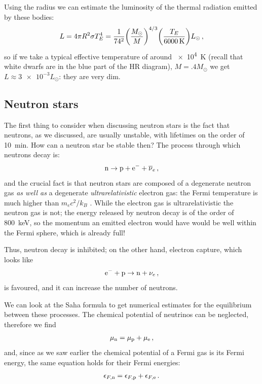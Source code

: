 \documentclass[main.tex]{subfiles}
\begin{document}
Using the radius we can estimate the luminosity of the thermal radiation emitted by these bodies:
%
\begin{align}
L = 4 \pi R^2 \sigma T_E^{4}
= \frac{1}{74^2} \qty(\frac{M_{\odot}}{M})^{4/3}
\qty(\frac{T_E }{\SI{6000}{K}}) L_{\odot}
\,,
\end{align}
%
so if we take a typical effective temperature of around \SI{e4}{K} (recall that white dwarfs are in the blue part of the HR diagram), \(M = \num{.4} M_{\odot}\) we get \(L \approx \num{3e-3} L_{\odot}\): they are very dim. 

\subsection{Neutron stars}

The first thing to consider when discussing neutron stars is the fact that neutrons, as we discussed, are usually unstable, with lifetimes on the order of \SI{10}{min}. How can a neutron star be stable then?
The process through which neutrons decay is:
%
\begin{align}
\ce{n} \rightarrow \ce{p} + \ce{e-} + \overline{\nu}_{e}
\,,
\end{align}
%
and the crucial fact is that neutron stars are composed of a degenerate neutron gas \emph{as well as} a degenerate \emph{ultrarelativistic} electron gas: the Fermi temperature is much higher than \(m_e c^2/ k_B\) \cite[eq.\ 1]{yakovlevNeutrinoEmissionNeutron}.
While the electron gas is ultrarelativistic the neutron gas is not; the energy released by neutron decay is of the order of \SI{800}{keV}, so the momentum an emitted electron would have would be well within the Fermi sphere, which is already full!

Thus, neutron decay is inhibited; on the other hand, electron capture, which looks like
%
\begin{align}
\ce{e-} + \ce{p} \rightarrow \ce{n} + \nu_{e}
\,,
\end{align}
%
is favoured, and it can increase the number of neutrons.

We can look at the Saha formula to get numerical estimates for the equilibrium between these processes.
The chemical potential of neutrinos can be neglected, therefore we find 
%
\begin{align}
\mu_{\ce{n}} = \mu_{\ce{p}} + \mu_{\ce{e}} 
\,,
\end{align}
%
and, since as we saw earlier the chemical potential of a Fermi gas is its Fermi energy, the same equation holds for their Fermi energies: 
%
\begin{align}
\epsilon_{F, \ce{n}} = \epsilon_{F, \ce{p}} + \epsilon_{F, \ce{e}}
\,.
\end{align}
%
\end{document}
